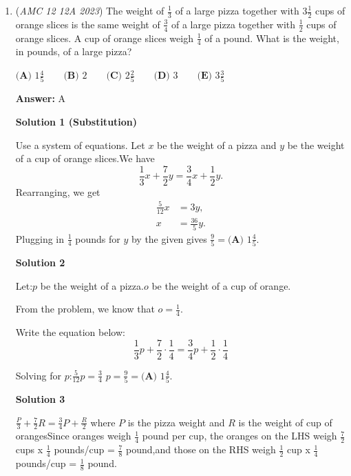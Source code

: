 \begin{enumerate}
 Therefore, the answer is $\boxed{\textbf{(E)}\ 27}$.

 


 


	\item (\textit{AMC 12 12A 2023}) The weight of $\frac{1}{3}$ of a large pizza together with $3 \frac{1}{2}$ cups of orange slices is the same weight of $\frac{3}{4}$ of a large pizza together with $\frac{1}{2}$ cups of orange slices. A cup of orange slices weigh $\frac{1}{4}$ of a pound. What is the weight, in pounds, of a large pizza?


 $\textbf{(A) }1\frac{4}{5}\qquad\textbf{(B) }2\qquad\textbf{(C) }2\frac{2}{5}\qquad\textbf{(D) }3\qquad\textbf{(E) }3\frac{3}{5}$

 \textbf{Answer: }A



\textbf{Solution 1 (Substitution)}

Use a system of equations. Let $x$ be the weight of a pizza and $y$ be the weight of a cup of orange slices.We have 
 \[\frac{1}{3}x+\frac{7}{2}y=\frac{3}{4}x+\frac{1}{2}y.\]Rearranging, we get 
 \begin{align*} \frac{5}{12}x&=3y, \\ x&=\frac{36}{5}y. \end{align*}
Plugging in $\frac{1}{4}$ pounds for $y$ by the given gives $\frac{9}{5}=\boxed{\textbf{(A) }1\frac{4}{5}}.$




\textbf{Solution 2}

Let:$p$ be the weight of a pizza.$o$ be the weight of a cup of orange.

 From the problem, we know that $o = \frac{1}{4}$.

 Write the equation below:
 \[\frac{1}{3} p + \frac{7}{2}\cdot\frac{1}{4} = \frac{3}{4} p + \frac{1}{2}\cdot\frac{1}{4}\]

 Solving for $p$:$\frac{5}{12} p = \frac{3}{4}$
$p = \frac{9}{5} = \boxed{\textbf{(A) }1\frac{4}{5}}.$




\textbf{Solution 3}

$\frac{P}{3} + \frac{7}{2} R = \frac{3}{4} P + \frac{R}{2}$ where $P$ is the pizza weight and $R$ is the weight of cup of orangesSince oranges weigh $\frac{1}{4}$ pound per cup, the oranges on the LHS weigh $\frac{7}{2}$ cups x $\frac{1}{4}$ pounds/cup = $\frac{7}{8}$ pound,and those on the RHS weigh $\frac{1}{2}$ cup x $\frac{1}{4}$ pounds/cup = $\frac{1}{8}$ pound.


\end{enumerate}
